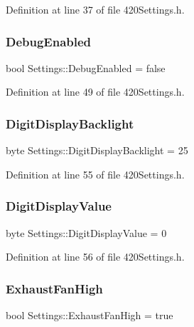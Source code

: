 Definition at line 37 of file 420\+Settings.\+h.

\mbox{\label{struct_settings_a84c9031aeb684accddd3ff472b96682d}} 
\subsubsection{\texorpdfstring{DebugEnabled}{DebugEnabled}}
{\footnotesize\ttfamily bool Settings\+::\+Debug\+Enabled = false}



Definition at line 49 of file 420\+Settings.\+h.

\mbox{\label{struct_settings_a1631b98ed48aad24809ede99512a5a7a}} 
\subsubsection{\texorpdfstring{DigitDisplayBacklight}{DigitDisplayBacklight}}
{\footnotesize\ttfamily byte Settings\+::\+Digit\+Display\+Backlight = 25}



Definition at line 55 of file 420\+Settings.\+h.

\mbox{\label{struct_settings_a427897ae557b8c65d3797cae3aac1743}} 
\subsubsection{\texorpdfstring{DigitDisplayValue}{DigitDisplayValue}}
{\footnotesize\ttfamily byte Settings\+::\+Digit\+Display\+Value = 0}



Definition at line 56 of file 420\+Settings.\+h.

\mbox{\label{struct_settings_aabd6831905f2f3dcbeb08b08d18af3a3}} 
\subsubsection{\texorpdfstring{ExhaustFanHigh}{ExhaustFanHigh}}
{\footnotesize\ttfamily bool Settings\+::\+Exhaust\+Fan\+High = true}



